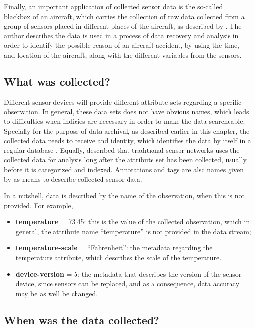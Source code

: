 Finally, an important application of collected sensor data is the so-called
blackbox of an aircraft, which carries the collection of raw data collected
from a group of sensors placed in different places of the aircraft, as
described by \cite{sn-exemple-blackbox}. The author describes the data is
used in a process of data recovery and analysis in order to identify the
possible reason of an aircraft accident, by using the time, and location of
the aircraft, along with the different variables from the sensors.

\subsection{What was collected?}

Different sensor devices will provide different attribute sets regarding a
specific observation. In general, these data sets does not have obvious names,
which leads to difficulties when indicies are necessary in order to make the
data searcheable. Specially for the purpose of data archival, as described
earlier in this chapter, the collected data needs to receive and identity,
which identifies the data by itself in a regular database
\cite{relational-model}. Equally, \cite{sn-provenance} described that
traditional sensor networks uses the collected data for analysis long after
the attribute set has been collected, usually before it is categorized and
indexed. Annotations and tags are also names given by \cite{sn-provenance} as
means to describe collected sensor data.

In a nutshell, data is described by the name of the observation, when this is
not provided. For example, 

\begin{itemize}
  \item \textbf{temperature} = 73.45: this is the value of the collected
  observation, which in general, the attribute name ``temperature'' is not
  provided in the data stream;
  \item \textbf{temperature-scale} = ``Fahrenheit'': the metadata regarding the
  temperature attribute, which describes the scale of the temperature.
  \item \textbf{device-version} = 5: the metadata that describes the version of
  the sensor device, since sensors can be replaced, and as a consequence, data
  accuracy may be as well be changed.
\end{itemize} 

\subsection{When was the data collected?}

